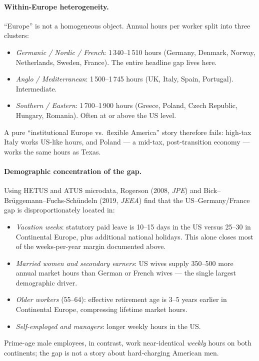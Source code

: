 \documentclass[11pt,a4paper]{article}
\begin{document}
\paragraph{Within-Europe heterogeneity.}
``Europe'' is not a homogeneous object. Annual hours per worker split into three clusters:
\begin{itemize}[leftmargin=*,nosep]
    \item \emph{Germanic / Nordic / French}: 1\,340--1\,510 hours (Germany, Denmark, Norway, Netherlands, Sweden, France). The entire headline gap lives here.
    \item \emph{Anglo / Mediterranean}: 1\,500--1\,745 hours (UK, Italy, Spain, Portugal). Intermediate.
    \item \emph{Southern / Eastern}: 1\,700--1\,900 hours (Greece, Poland, Czech Republic, Hungary, Romania). Often at or above the US level.
\end{itemize}
A pure ``institutional Europe vs.\ flexible America'' story therefore fails: high-tax Italy works US-like hours, and Poland --- a mid-tax, post-transition economy --- works the same hours as Texas.

\paragraph{Demographic concentration of the gap.}
Using HETUS and ATUS microdata, Rogerson (2008, \emph{JPE}) and Bick--Br\"uggemann--Fuchs-Sch\"undeln (2019, \emph{JEEA}) find that the US--Germany/France gap is disproportionately located in:
\begin{itemize}[leftmargin=*,nosep]
    \item \emph{Vacation weeks}: statutory paid leave is 10--15 days in the US versus 25--30 in Continental Europe, plus additional national holidays. This alone closes most of the weeks-per-year margin documented above.
    \item \emph{Married women and secondary earners}: US wives supply 350--500 more annual market hours than German or French wives --- the single largest demographic driver.
    \item \emph{Older workers} (55--64): effective retirement age is 3--5 years earlier in Continental Europe, compressing lifetime market hours.
    \item \emph{Self-employed and managers}: longer weekly hours in the US.
\end{itemize}
Prime-age male employees, in contrast, work near-identical \emph{weekly} hours on both continents; the gap is not a story about hard-charging American men.
\end{document}
